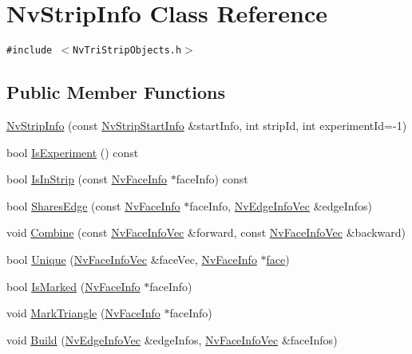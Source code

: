 \hypertarget{class_nv_strip_info}{
\section{NvStripInfo Class Reference}
\label{class_nv_strip_info}
}
{\tt \#include $<$NvTriStripObjects.h$>$}

\subsection*{Public Member Functions}
\begin{CompactItemize}
\item 
\hyperlink{class_nv_strip_info_bff0ec4c94a3d7a54d6c2f6a9752f979}{NvStripInfo} (const \hyperlink{class_nv_strip_start_info}{NvStripStartInfo} \&startInfo, int stripId, int experimentId=-1)
\item 
bool \hyperlink{class_nv_strip_info_f6c1f7debc45a19d3025231bc8ea7dd8}{IsExperiment} () const 
\item 
bool \hyperlink{class_nv_strip_info_702a14b14312b436f64d481623e67615}{IsInStrip} (const \hyperlink{class_nv_face_info}{NvFaceInfo} $\ast$faceInfo) const 
\item 
bool \hyperlink{class_nv_strip_info_2ad96d160c282ac7921c33c0ce1c12b0}{SharesEdge} (const \hyperlink{class_nv_face_info}{NvFaceInfo} $\ast$faceInfo, \hyperlink{_nv_tri_strip_objects_8h_58592f6a13118931e843d05574249663}{NvEdgeInfoVec} \&edgeInfos)
\item 
void \hyperlink{class_nv_strip_info_3944545c70cac884f64248b8f100ec0a}{Combine} (const \hyperlink{_nv_tri_strip_objects_8h_93d0a2f26991e801145908bc4d3d9156}{NvFaceInfoVec} \&forward, const \hyperlink{_nv_tri_strip_objects_8h_93d0a2f26991e801145908bc4d3d9156}{NvFaceInfoVec} \&backward)
\item 
bool \hyperlink{class_nv_strip_info_3c611dfae22e219ed0eedcb95fd33d1c}{Unique} (\hyperlink{_nv_tri_strip_objects_8h_93d0a2f26991e801145908bc4d3d9156}{NvFaceInfoVec} \&faceVec, \hyperlink{class_nv_face_info}{NvFaceInfo} $\ast$\hyperlink{glext_8h_676ca580c460c0154eb58200433d2a9e}{face})
\item 
bool \hyperlink{class_nv_strip_info_39fda0ba3c1858cf70f9925e7f6db775}{IsMarked} (\hyperlink{class_nv_face_info}{NvFaceInfo} $\ast$faceInfo)
\item 
void \hyperlink{class_nv_strip_info_39fa1a91968f900b5fa1280f018ac15b}{MarkTriangle} (\hyperlink{class_nv_face_info}{NvFaceInfo} $\ast$faceInfo)
\item 
void \hyperlink{class_nv_strip_info_af6dc94b04e07e3d404a23e829cfadeb}{Build} (\hyperlink{_nv_tri_strip_objects_8h_58592f6a13118931e843d05574249663}{NvEdgeInfoVec} \&edgeInfos, \hyperlink{_nv_tri_strip_objects_8h_93d0a2f26991e801145908bc4d3d9156}{NvFaceInfoVec} \&faceInfos)
\end{CompactItemize}

